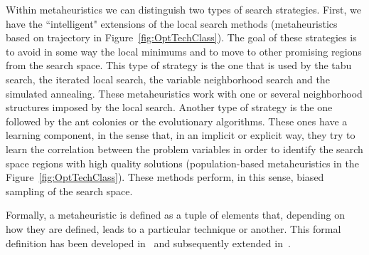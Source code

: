 Within metaheuristics we can distinguish two types of search strategies. First, we have the ``intelligent" extensions  of the local search methods (metaheuristics based on trajectory in Figure~\ref{fig:OptTechClass}). The goal of these strategies is to avoid in some way the local minimums and to move to other promising regions from the search space. This type of strategy is the one that is used by the tabu search, the iterated local search, the variable neighborhood search and the simulated annealing. These metaheuristics work with one or several neighborhood structures imposed by the local search. Another type of strategy is the one followed by the ant colonies or the evolutionary algorithms. These ones have a learning component, in the sense that, in an implicit or explicit way, they try to learn the correlation between the problem variables in order to identify the search space regions with high quality solutions (population-based metaheuristics in the Figure~\ref{fig:OptTechClass}). These methods perform, in this sense, biased sampling of the search space.

Formally, a metaheuristic is defined as a tuple of elements that, depending on how they are defined, leads to a particular technique or another. This formal definition has been developed in~\cite{luque06resolucion} and subsequently extended in~\cite{chicano06metaheuristica}.


